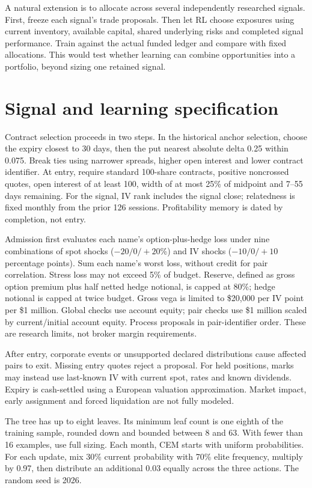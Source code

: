 \documentclass[11pt,letterpaper]{article}
\newcommand{\money}[1]{\$#1}
\begin{document}
A natural extension is to allocate across several independently researched
signals. First, freeze each signal's trade proposals. Then let RL choose
exposures using current inventory, available capital, shared underlying risks
and completed signal performance. Train against the actual funded ledger and
compare with fixed allocations. This would test whether learning can combine
opportunities into a portfolio, beyond sizing one retained signal.

\clearpage
\appendix
\footnotesize
\section{Signal and learning specification}
\label{app:implementation}
Contract selection proceeds in two steps. In the historical anchor selection,
choose the expiry closest to 30 days, then the put nearest absolute delta 0.25
within 0.075. Break ties using narrower spreads, higher open interest and
lower contract identifier. At entry, require standard 100-share contracts,
positive noncrossed quotes, open interest of at least 100, width of at most
25\% of midpoint and 7--55 days remaining. For the signal, IV rank includes
the signal close; relatedness is fixed monthly from the prior 126 sessions.
Profitability memory is dated by completion, not entry.

Admission first evaluates each name's option-plus-hedge loss under nine
combinations of spot shocks ($-20/0/+20$\%) and IV shocks ($-10/0/+10$
percentage points). Sum each name's worst loss, without credit for pair
correlation. Stress loss may not exceed 5\% of budget. Reserve, defined as
gross option premium plus half netted hedge notional, is capped at 80\%;
hedge notional is capped at twice budget. Gross vega is limited to
\money{20,000} per IV point per \money{1 million}. Global checks use account
equity; pair checks use \money{1 million} scaled by current/initial account
equity. Process proposals in pair-identifier order. These are research limits,
not broker margin requirements.

After entry, corporate events or unsupported declared distributions cause
affected pairs to exit. Missing entry quotes reject a proposal. For held
positions, marks may instead use last-known IV with current spot, rates and
known dividends. Expiry is cash-settled using a European valuation approximation.
Market impact, early assignment and forced liquidation are not fully modeled.

The tree has up to eight leaves. Its minimum leaf count is one eighth of the
training sample, rounded down and bounded between 8 and 63. With fewer than
16 examples, use full sizing. Each month, CEM starts with uniform probabilities.
For each update, mix 30\% current probability with 70\% elite frequency,
multiply by 0.97, then distribute an additional 0.03 equally across the three
actions. The random seed is 2026.
\end{document}

